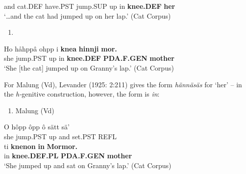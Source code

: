   and  cat.DEF  have.PST  jump.SUP  up in  \textbf{knee.DEF} \textbf{her} \\ %


 ‘…and the cat had jumped up on her lap.’ (Cat Corpus)
\z


\begin{enumerate} %
\item 
\end{enumerate} %
\ea\label{}
\gll Ho  håhppâ  ohpp  i  \textbf{knea} \textbf{hinnji} \textbf{mor.}\\


she  jump.PST  up  in  \textbf{knee.DEF} \textbf{PDA.F.GEN} \textbf{mother}\\ %


‘She [the cat] jumped up on Granny’s lap.’ (Cat Corpus)
\z


For Malung (Vd), Levander (1925: 2:211) gives the form \textit{hännäsäs} for ‘her’ – in the \textit{h-}genitive construction, however, the form is \textit{in}: 

\begin{enumerate} %
\item 
Malung (Vd)

\end{enumerate} %
\ea\label{}
\gll O  hôpp  ôpp  ô  sätt  sä’  \\


she  jump.PST  up  and  set.PST  REFL  \\ %


\ea\label{}
\gll ti  \textbf{knenon} \textbf{in} \textbf{Mormor.}\\


in  \textbf{knee.DEF.PL} \textbf{PDA.F.GEN} \textbf{mother}\\ %


‘She jumped up and sat on Granny’s lap.’ (Cat Corpus)
\z


